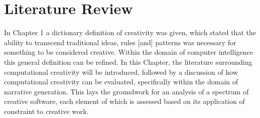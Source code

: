 \documentclass[letterpaper]{article}
\begin{document}
\section{Literature Review}
In Chapter 1 a dictionary definition of creativity was given, which stated that the ability to transcend traditional ideas, rules [and] patterns  was necessary for something to be considered creative. Within the domain of computer intelligence this general definition can be refined. In this Chapter, the literature surrounding computational creativity will be introduced, followed by a discussion of how computational creativity can be evaluated, specifically within the domain of narrative generation. This lays the groundwork for an analysis of a spectrum of creative software, each element of which is assessed based on its application of constraint to creative work.

\end{document}
